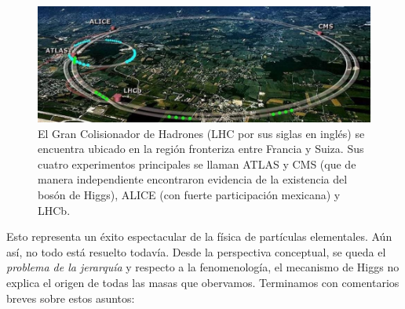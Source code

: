 \begin{figure}
\centering
\includegraphics[scale=0.4]{images/lhc.jpg}
\caption{El Gran Colisionador de Hadrones (LHC por sus siglas en
ingl\'es) se encuentra ubicado en la regi\'on fronteriza entre
Francia y Suiza.
Sus cuatro experimentos principales se llaman ATLAS y CMS (que
de manera independiente encontraron evidencia de la existencia
del bos\'on de Higgs), ALICE (con fuerte participaci\'on mexicana)
y LHCb.}
\end{figure}

Esto representa un \'exito espectacular de la f\'isica de part\'iculas
elementales. A\'un as\'i, no todo est\'a resuelto todav\'ia. Desde la
perspectiva conceptual, se queda el {\em problema de la jerarqu\'ia}
y respecto a la fenomenolog\'ia, el mecanismo de Higgs no explica
el origen de todas las masas que obervamos. Terminamos con
comentarios breves sobre estos asuntos:

